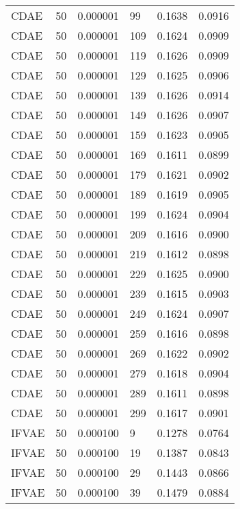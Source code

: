 \begin{tabular}{llrlrr}
    CDAE &   50 &  0.000001 &    99 &  0.1638 &       0.0916 \\
    CDAE &   50 &  0.000001 &   109 &  0.1624 &       0.0909 \\
    CDAE &   50 &  0.000001 &   119 &  0.1626 &       0.0909 \\
    CDAE &   50 &  0.000001 &   129 &  0.1625 &       0.0906 \\
    CDAE &   50 &  0.000001 &   139 &  0.1626 &       0.0914 \\
    CDAE &   50 &  0.000001 &   149 &  0.1626 &       0.0907 \\
    CDAE &   50 &  0.000001 &   159 &  0.1623 &       0.0905 \\
    CDAE &   50 &  0.000001 &   169 &  0.1611 &       0.0899 \\
    CDAE &   50 &  0.000001 &   179 &  0.1621 &       0.0902 \\
    CDAE &   50 &  0.000001 &   189 &  0.1619 &       0.0905 \\
    CDAE &   50 &  0.000001 &   199 &  0.1624 &       0.0904 \\
    CDAE &   50 &  0.000001 &   209 &  0.1616 &       0.0900 \\
    CDAE &   50 &  0.000001 &   219 &  0.1612 &       0.0898 \\
    CDAE &   50 &  0.000001 &   229 &  0.1625 &       0.0900 \\
    CDAE &   50 &  0.000001 &   239 &  0.1615 &       0.0903 \\
    CDAE &   50 &  0.000001 &   249 &  0.1624 &       0.0907 \\
    CDAE &   50 &  0.000001 &   259 &  0.1616 &       0.0898 \\
    CDAE &   50 &  0.000001 &   269 &  0.1622 &       0.0902 \\
    CDAE &   50 &  0.000001 &   279 &  0.1618 &       0.0904 \\
    CDAE &   50 &  0.000001 &   289 &  0.1611 &       0.0898 \\
    CDAE &   50 &  0.000001 &   299 &  0.1617 &       0.0901 \\
   IFVAE &   50 &  0.000100 &     9 &  0.1278 &       0.0764 \\
   IFVAE &   50 &  0.000100 &    19 &  0.1387 &       0.0843 \\
   IFVAE &   50 &  0.000100 &    29 &  0.1443 &       0.0866 \\
   IFVAE &   50 &  0.000100 &    39 &  0.1479 &       0.0884 \\

\end{tabular}
